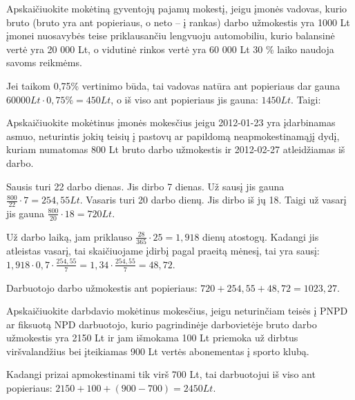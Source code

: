 \begin{tasks}
  \begin{task}
    \begin{condition}
      Apskaičiuokite mokėtiną gyventojų pajamų mokestį, jeigu
      įmonės vadovas, kurio bruto (bruto yra ant popieriaus, o
      neto – į rankas) darbo užmokestis yra 1000 Lt įmonei nuosavybės
      teise priklausančiu lengvuoju automobiliu, kurio balansinė
      vertė yra 20 000 Lt, o vidutinė rinkos vertė yra 60 000 Lt
      30 \% laiko naudoja savoms reikmėms.
    \end{condition}
    \begin{solution}
      Jei taikom 0,75\% vertinimo būda, tai vadovas natūra ant
      popieriaus dar gauna $60000Lt \cdot 0,75\% = 450 Lt$,
      o iš viso ant popieriaus jis gauna: $1450 Lt$. Taigi:

      
    \end{solution}
  \end{task}

  \begin{task}
    \begin{condition}
      Apskaičiuokite mokėtinus įmonės mokesčius jeigu 2012-01-23
      yra įdarbinamas asmuo, neturintis jokių teisių į pastovų ar
      papildomą neapmokestinamąjį dydį, kuriam numatomas 800 Lt
      bruto darbo užmokestis ir 2012-02-27 atleidžiamas iš darbo.
    \end{condition}
    \begin{solution}
      Sausis turi 22 darbo dienas. Jis dirbo 7 dienas. Už sausį jis
      gauna $\frac{800}{22} \cdot 7 = 254,55 Lt$. Vasaris turi 20 darbo
      dienų. Jis dirbo iš jų 18. Taigi už vasarį jis gauna
      $\frac{800}{20} \cdot 18 = 720 Lt$.

      Už darbo laiką, jam priklauso $\frac{28}{365} \cdot 25 = 1,918$
      dienų atostogų. Kadangi jis atleistas vasarį, tai skaičiuojame
      įdirbį pagal praeitą mėnesį, tai yra sausį:
      $1,918 \cdot 0,7 \cdot \frac{254,55}{7} %
      = 1,34 \cdot \frac{254,55}{7} = 48,72$.

      Darbuotojo darbo užmokestis ant popieriaus:
      $720 + 254,55 + 48,72 = 1023,27$.


    \end{solution}
  \end{task}

  \begin{task}
    \begin{condition}
      Apskaičiuokite darbdavio mokėtinus mokesčius, jeigu
      neturinčiam teisės į PNPD ar fiksuotą NPD darbuotojo, kurio
      pagrindinėje darbovietėje bruto darbo užmokestis yra 2150 Lt ir
      jam išmokama 100 Lt priemoka už dirbtus viršvalandžius bei
      įteikiamas 900 Lt vertės abonementas į sporto klubą.
    \end{condition}
    \begin{solution}
      Kadangi prizai apmokestinami tik virš 700 Lt, tai darbuotojui
      iš viso ant popieriaus: $2150 + 100 + (900 - 700) = 2450 Lt$.


\end{solution}
\end{task}
\end{tasks}

